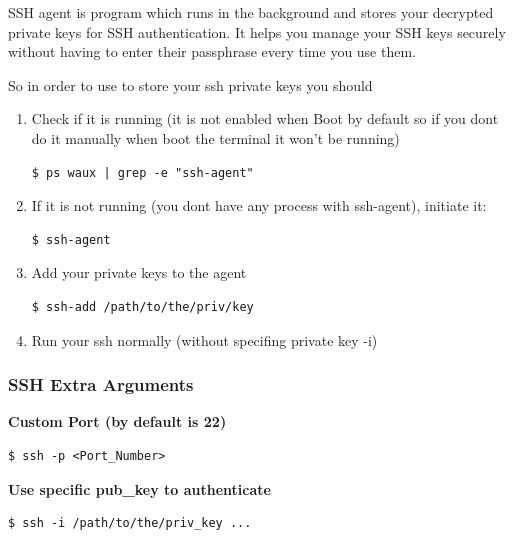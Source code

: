 \documentclass{article}
\newenvironment{codetemplate}[1][]{%
  \mybasecolorbox[#1]
  \itshape
}{%
  \endmybasecolorbox
}
\begin{document}
SSH agent is program which runs in the background and stores your decrypted private keys for SSH authentication. It helps you manage your SSH keys securely without having to enter their passphrase every time you use them.

So in order to use to store your ssh private keys you should

\begin{enumerate}
    \item Check if it is running (it is not enabled when Boot by default so if you dont do it manually when boot the terminal it won't be running)
\begin{codetemplate}{}
\begin{verbatim}
$ ps waux | grep -e "ssh-agent"
\end{verbatim}
\end{codetemplate}

    \item If it is not running (you dont have any process with ssh-agent), initiate it:
\begin{codetemplate}{}
\begin{verbatim}
$ ssh-agent
\end{verbatim}
\end{codetemplate}

    \item Add your private keys to the agent
\begin{codetemplate}{}
\begin{verbatim}
$ ssh-add /path/to/the/priv/key
\end{verbatim}
\end{codetemplate}

    \item Run your ssh normally (without specifing private key -i)
\end{enumerate}

\subsubsection{SSH Extra Arguments}

\textbf{Custom Port (by default is 22)}
\begin{codetemplate}{}
\begin{verbatim}
$ ssh -p <Port_Number>
\end{verbatim}
\end{codetemplate}

\textbf{Use specific pub\_key to authenticate}
\begin{codetemplate}{}
\begin{verbatim}
$ ssh -i /path/to/the/priv_key ...
\end{verbatim}
\end{codetemplate}
\end{document}
